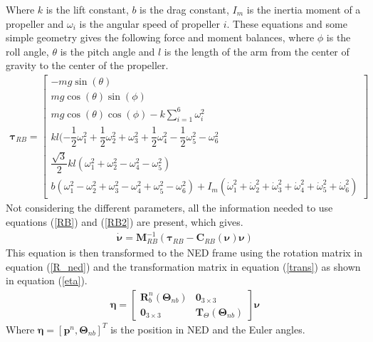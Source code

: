 Where $k$ is the lift constant, $b$ is the drag constant, $I_m$ is the inertia moment of a propeller and $\omega_i$ is the angular speed of propeller $i$. These equations and some simple geometry gives the following force and moment balances, where $\phi$ is the roll angle, $\theta$ is the pitch angle and $l$ is the length of the arm from the center of gravity to the center of the propeller.
\begin{eqnarray}
\boldsymbol{\tau}_{RB} = \begin{bmatrix}
-mg\sin(\theta)\\
mg\cos(\theta)\sin(\phi)\\
mg\cos(\theta)\cos(\phi) - k \sum_{i=1}^6\omega_i^2\\
kl(-\dfrac{1}{2}\omega_1^2 +\dfrac{1}{2}\omega_2^2 + \omega_3^2 +\dfrac{1}{2}\omega_4^2 -\dfrac{1}{2}\omega_5^2 -\omega_6^2\\
\dfrac{\sqrt{3}}{2}kl(\omega_1^2 + \omega_2^2 - \omega_4^2 - \omega_5^2)\\
b(\omega_1^2 - \omega_2^2 + \omega_3^2 - \omega_4^2 + \omega_5^2 - \omega_6^2) + I_m(\dot{\omega}_1^2 + \dot{\omega}_2^2 + \dot{\omega}_3^2 + \dot{\omega}_4^2 + \dot{\omega}_5^2 + \dot{\omega}_6^2)
\end{bmatrix}
\label{tau}
\end{eqnarray}
Not considering the different parameters, all the information needed to use equations (\ref{RB}) and (\ref{RB2}) are present, which gives.
\begin{eqnarray}
\dot{\boldsymbol{\nu}} = \boldsymbol{M}_{RB}^{-1}(\boldsymbol{\tau}_{RB} - \boldsymbol{C}_{RB}(\boldsymbol{\nu})\boldsymbol{\nu})
\end{eqnarray}
This equation is then transformed to the NED frame using the rotation matrix in equation (\ref{R_ned}) and the transformation matrix in equation (\ref{trans}) as shown in equation (\ref{eta}).
\begin{eqnarray}
\boldsymbol{\eta} = \begin{bmatrix}
\boldsymbol{R}_b^n(\boldsymbol{\Theta}_{nb}) & \boldsymbol{0}_{3 \times 3}\\
\boldsymbol{0}_{3 \times 3} & \boldsymbol{T}_\Theta(\boldsymbol{\Theta}_{nb})
\end{bmatrix}
\boldsymbol{\nu}
\label{eta}
\end{eqnarray}
Where $\boldsymbol{\eta} = [\boldsymbol{p}^n, \boldsymbol{\Theta}_{nb}]^T$ is the position in NED and the Euler angles.
